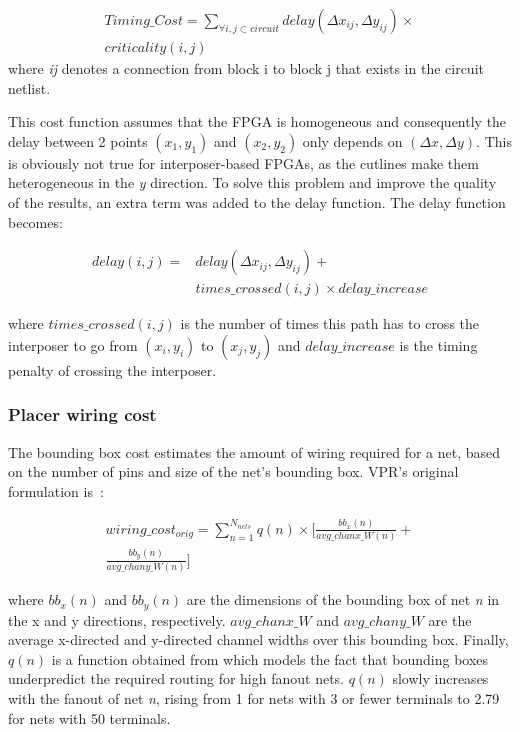 \documentclass{sig-alternate-2013}
\begin{document}
\begin{equation} \label{eq:timing_eq_full}
\begin{split}
Timing\_Cost = \sum_{\forall i, j \subset circuit} delay(\Delta x_{ij},\Delta y_{ij}) \times \\ 
criticality(i,j)
\end{split}
\end{equation}
where \textit{ij} denotes a connection from block i to block j that exists in the circuit netlist.

This cost function assumes that the FPGA is homogeneous and consequently the delay between 2 points $(x_1,y_1)$ and $(x_2,y_2)$ only depends on $(\Delta x,\Delta y)$. This is obviously not true for interposer-based FPGAs, as the cutlines make them heterogeneous in the \textit{y} direction. To solve this problem and improve the quality of the results, an extra term was added to the delay function. The delay function becomes:

\begin{equation} \label{eq:timing_cost}
\begin{split}
delay(i,j) =& delay(\Delta x_{ij}, \Delta y_{ij}) + \\
&times\_crossed(i,j) \times delay\_increase
\end{split}
\end{equation}

where $times\_crossed(i,j)$ is the number of times this path has to cross the interposer to go from $(x_i,y_i)$ to $(x_j,y_j)$ and $delay\_increase$ is the timing penalty of crossing the interposer.

\subsubsection{Placer wiring cost}
The bounding box cost estimates the amount of wiring required for a net, based on the number of pins and size of the net's bounding box. VPR's original formulation is~\cite{betz1997vpr}:

\begin{equation} \label{eq:bbcost}
\begin{split}
wiring\_cost_{orig} = \sum_{n=1}^{N_{nets}} q(n) \times [\frac{bb_x(n)}{avg\_chanx\_W(n)} + \\
\frac{bb_y(n)}{avg\_chany\_W(n)}]
\end{split}
\end{equation}

where $bb_x(n)$ and $bb_y(n)$ are the dimensions of the bounding box of net \textit{n} in the x and y directions, respectively. $avg\_chanx\_W$ and $avg\_chany\_W$ are the average x-directed and y-directed channel widths over this bounding box. Finally, $q(n)$ is a function obtained from \cite{icann} which models the fact that bounding boxes underpredict the required routing for high fanout nets. $q(n)$ slowly increases with the fanout of net \textit{n}, rising from 1 for nets with 3 or fewer terminals to 2.79 for nets with 50 terminals.
\end{document}
